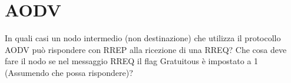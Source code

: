 \section{AODV}

\begin{questions}
    \question In quali casi un nodo intermedio (non destinazione) che utilizza il protocollo AODV può rispondere con RREP alla ricezione di una RREQ? Che cosa deve fare il nodo se nel messaggio RREQ il flag Gratuitous è impostato a 1 (Assumendo che possa rispondere)? 
    
    \begin{solution}
        
    \end{solution}
\end{questions}